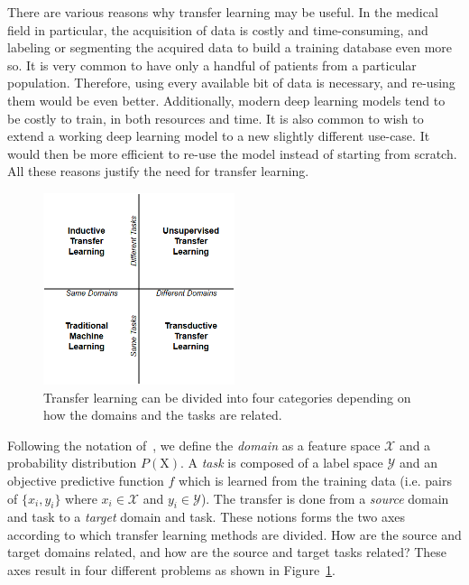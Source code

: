 There are various reasons why transfer learning may be useful. In the medical field in particular, the acquisition of data is costly and time-consuming, and labeling or segmenting the acquired data to build a training database even more so. It is very common to have only a handful of patients from a particular population. Therefore, using every available bit of data is necessary, and re-using them would be even better. Additionally, modern deep learning models tend to be costly to train, in both resources and time. It is also common to wish to extend a working deep learning model to a new slightly different use-case. It would then be more efficient to re-use the model instead of starting from scratch. All these reasons justify the need for transfer learning.

\begin{figure}[htb]
    \centering
	\includegraphics[width=0.5\textwidth]{img_transfer/transfer_types.png}
    \caption{Transfer learning can be divided into four categories depending on how the domains and the tasks are related.}
    \label{fig:transfer_types}
\end{figure}

Following the notation of~\textcite{pan2010TNDE}, we define the \textit{domain} as a feature space $\mathcal{X}$ and a probability distribution $P\left( \mathrm{X} \right)$. A \textit{task} is composed of a label space $\mathcal{Y}$ and an objective predictive function $f$ which is learned from the training data (i.e. pairs of $\{ x_i, y_i \}$ where $x_i \in \mathcal{X}$ and $y_i \in \mathcal{Y}$). The transfer is done from a \textit{source} domain and task to a \textit{target} domain and task. These notions forms the two axes according to which transfer learning methods are divided. How are the source and target domains related, and how are the source and target tasks related? These axes result in four different problems as shown in Figure~\ref{fig:transfer_types}. 


